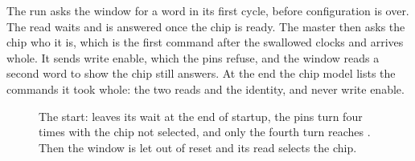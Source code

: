 The run asks the window for a word in its first cycle, before
configuration is over. The read waits and is answered once the chip is
ready. The master then asks the chip who it is, which is the first
command after the swallowed clocks and arrives whole. It sends write
enable, which the pins refuse, and the window reads a second word to
show the chip still answers. At the end the chip model lists the
commands it took whole: the two reads and the identity, and never
write enable.

\begin{figure}[htbp]
\centering

\caption{The start:  leaves its wait at the end of startup,
the pins turn  four times with the chip not selected,
and only the fourth turn reaches . Then the window is let
out of reset and its read selects the chip.}
\label{fig:x-cfgflash}
\end{figure}




